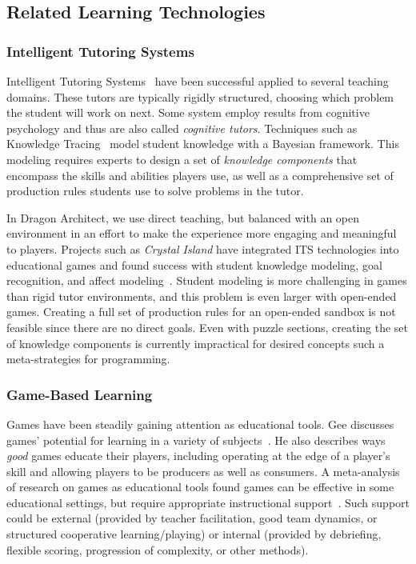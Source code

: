 \documentclass{sig-alternate}
\newcommand{\gametitle}{{Dragon Architect}}
\begin{document}
\subsection{Related Learning Technologies}

\subsubsection{Intelligent Tutoring Systems}
Intelligent Tutoring Systems~\cite{koedinger06cognitive} have been successful applied to several teaching domains.
These tutors are typically rigidly structured, choosing which problem the student will work on next.
Some system employ results from cognitive psychology and thus are also called \emph{cognitive tutors}.
Techniques such as Knowledge Tracing~\cite{corbett1994knowledge} model student knowledge with a Bayesian framework.
This modeling requires experts to design a set of \emph{knowledge components} that encompass the skills and abilities players use, as well as a comprehensive set of production rules students use to solve problems in the tutor.

In \gametitle{}, we use direct teaching, but balanced with an open environment in an effort to make the experience more engaging and meaningful to players.
Projects such as \emph{Crystal Island} have integrated ITS technologies into educational games and found success with student knowledge modeling, goal recognition, and affect modeling~\cite{lester2013serious,rowe2010modeling}.
Student modeling is more challenging in games than rigid tutor environments, and this problem is even larger with open-ended games.
Creating a full set of production rules for an open-ended sandbox is not feasible since there are no direct goals.
Even with puzzle sections, creating the set of knowledge components is currently impractical for desired concepts such a meta-strategies for programming.

\subsubsection{Game-Based Learning}
Games have been steadily gaining attention as educational tools. 
Gee discusses games' potential for learning in a variety of subjects~\cite{gee2003video}.
He also describes ways \emph{good} games educate their players, including operating at the edge of a player's skill and allowing players to be producers as well as consumers.
A meta-analysis of research on games as educational tools found games can be effective in some educational settings, but require appropriate instructional support~\cite{ke2009qualitative}.
Such support could be external (provided by teacher facilitation, good team dynamics, or structured cooperative learning/playing) or internal (provided by debriefing, flexible scoring, progression of complexity, or other methods).
\end{document}
